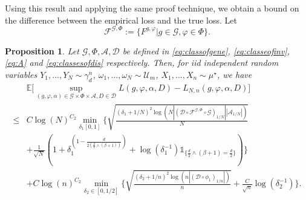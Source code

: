 \documentclass[10pt]{article}
\newtheorem{proposition}{Proposition}
\begin{document}
Using this result and  applying the same proof technique, we obtain a bound on the difference between the empirical loss and the true loss. Let
\begin{equation}\label{eq:fgphi2}
    \mathcal{F}^{\mathcal{G},\Phi}:=\{F^{g,\varphi}|g\in \mathcal{G}, \varphi \in \Phi\}.
\end{equation}



\begin{proposition}\label{prop:statisticalerror} Let 
$\mathcal{G},
\Phi,
\mathcal{A},
\mathcal{D}$ be defined in \eqref{eq:classofgene}, \eqref{eq:classeofinv}, \eqref{eq:A} and \eqref{eq:classesofdis} respectively. Then, for iid independent random variables  $Y_1,...,Y_N\sim \gamma_d^n$, $\omega_1,...,\omega_N\sim \mathcal{U}_m$, $X_1,...,X_n\sim \mu^\star$, we have
\begin{align*}
& \mathbb{E}\Big[\sup_{(g,\varphi,\alpha)\in \mathcal{G}\times  \Phi\times \mathcal{A},D\in \mathcal{D}} L(g,\varphi,\alpha,D)-L_{N,n}(g,\varphi,\alpha,D)\Big]\\
 \leq &  C\log(N)^{C_2} \min \limits_{\delta_1 [0,1]}  \Biggl\{ \sqrt{\frac{(\delta_1+1/N)^2\log(N|(\mathcal{D}\circ\mathcal{F}^{\mathcal{G},\Phi}\circ \mathcal{G})_{1/N}||\mathcal{A}_{1/N}|)}{N}}\\
 &+\frac{1}{\sqrt{N}}(1+\delta_1^{(1-\frac{d}{2(\frac{d}{2}\wedge(\beta+1))})}+\log(\delta^{-1}_1)\mathds{1}_{\{\frac{d}{2}\wedge(\beta+1)= \frac{d}{2}\}})\Biggl\}\\
& + C\log(n)^{C_2}\min \limits_{\delta_2 \in [0,1/2]}  \Biggl\{  \sqrt{\frac{(\delta_2+1/n)^2\log(n|(\mathcal{D} \circ \phi_1)_{1/n}|)}{n}}+\frac{C}{\sqrt{n}}\log(\delta_2^{-1})\Biggl\}.
\end{align*}
\end{proposition}
\end{document}
